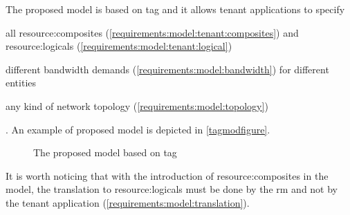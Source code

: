 The proposed model is based on \gls{tag} and it allows tenant applications to specify
\begin{mylist}
    \item all \glspl{resource:composite} (\cmark \ref{requirements:model:tenant:composites}) and \glspl{resource:logical} (\cmark \ref{requirements:model:tenant:logical})
    \item different bandwidth demands (\cmark \ref{requirements:model:bandwidth}) for different entities
    \item any kind of network topology (\cmark \ref{requirements:model:topology})
\end{mylist}.
An example of proposed model is depicted in \autoref{tagmodfigure}.

\begin{figure}[!htb]
    \centering
    \usebox{\tagmodfigure}
    \caption{The proposed model based on \gls{tag}}
    \label{tagmodfigure}
\end{figure}

It is worth noticing that with the introduction of \glspl{resource:composite} in the model, the translation to \glspl{resource:logical} must be done by the \gls{rm} and not by the tenant application (\cmark \ref{requirements:model:translation}).